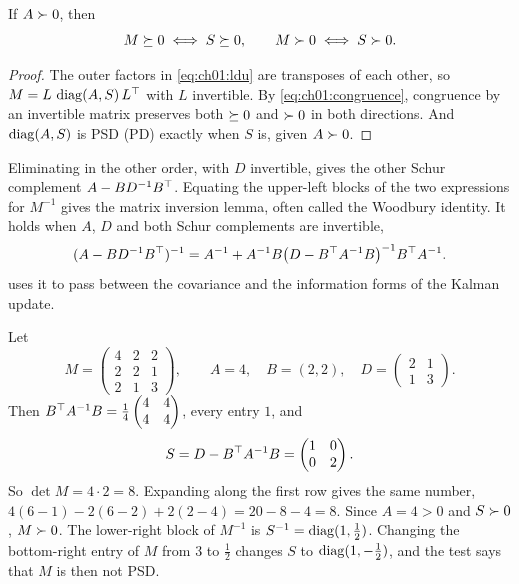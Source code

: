 \begin{theorem}\label{thm:ch01:schurpsd}
If $A\succ0$, then
\begin{equation}\label{eq:ch01:schurpsd}
M\succeq 0 \iff S\succeq0,\qquad M\succ0\iff S\succ0 .
\end{equation}
\end{theorem}

\begin{proof}
The outer factors in \cref{eq:ch01:ldu} are transposes of each other, so
$M=L\,\operatorname{diag}(A,S)\,L^{\top}$ with $L$ invertible. By \cref{eq:ch01:congruence},
congruence by an invertible matrix preserves both $\succeq0$ and $\succ0$ in both
directions. And $\operatorname{diag}(A,S)$ is PSD (PD) exactly when $S$ is, given $A\succ0$.
\end{proof}

Eliminating in the other order, with $D$ invertible, gives the other Schur
complement $A-BD^{-1}B^{\top}$. Equating the upper-left blocks of the two expressions
for $M^{-1}$ gives the matrix inversion lemma, often called the Woodbury
identity. It holds when $A$, $D$ and both Schur complements are invertible,
\begin{equation}\label{eq:ch01:woodbury}
(A-BD^{-1}B^{\top})^{-1}=A^{-1}+A^{-1}B\big(D-B^{\top} A^{-1}B\big)^{-1}B^{\top} A^{-1}.
\end{equation}
 uses it to pass between the covariance and the information forms of
the Kalman update.

\begin{example}\label{ex:ch01:schur}
Let
\[
M=\begin{pmatrix}4&2&2\\2&2&1\\2&1&3\end{pmatrix},\qquad A=4,\quad B=(2,2),\quad D=\begin{pmatrix}2&1\\1&3\end{pmatrix}.
\]
Then $B^{\top} A^{-1}B=\tfrac14\begin{pmatrix}4&4\\4&4\end{pmatrix}$, every entry $1$,
and
\[
S=D-B^{\top} A^{-1}B=\begin{pmatrix}1&0\\0&2\end{pmatrix}.
\]
So $\det M=4\cdot2=8$. Expanding along the first row gives the same number,
$4(6-1)-2(6-2)+2(2-4)=20-8-4=8$. Since $A=4>0$ and $S\succ0$, $M\succ0$. The
lower-right block of $M^{-1}$ is $S^{-1}=\operatorname{diag}(1,\tfrac12)$. Changing the
bottom-right entry of $M$ from $3$ to $\tfrac12$ changes $S$ to
$\operatorname{diag}(1,-\tfrac12)$, and the test says that $M$ is then not PSD.
\end{example}

